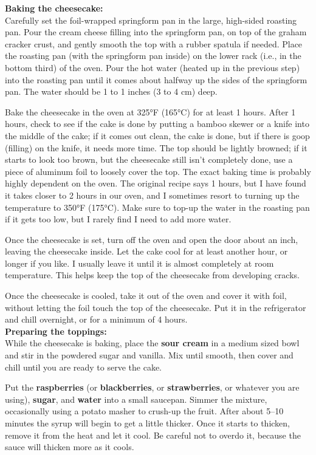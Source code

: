 \noindent \textbf{Baking the cheesecake:} \\ 
Carefully set the foil-wrapped springform pan in the large, high-sided roasting pan. 
Pour the cream cheese filling into the springform pan, on top of the graham cracker crust, and gently smooth the top with a rubber spatula if needed. 
Place the roasting pan (with the springform pan inside) on the lower rack (i.e., in the bottom third) of the oven. 
Pour the hot water (heated up in the previous step) into the roasting pan until it comes about halfway up the sides of the springform pan. 
The water should be 1 to 1 inches (3 to 4 cm) deep. 

Bake the cheesecake in the oven at 325°F (165°C) for at least 1 hours. 
After 1 hours, check to see if the cake is done by putting a bamboo skewer or a knife into the middle of the cake; if it comes out clean, the cake is done, but if there is goop (filling) on the knife, it needs more time. 
The top should be lightly browned; if it starts to look too brown, but the cheesecake still isn’t completely done, use a piece of aluminum foil to loosely cover the top. 
The exact baking time is probably highly dependent on the oven. 
The original recipe says 1 hours, but I have found it takes closer to 2 hours in our oven, and I sometimes resort to turning up the temperature to 350°F (175°C).
Make sure to top-up the water in the roasting pan if it gets too low, but I rarely find I need to add more water.

Once the cheesecake is set, turn off the oven and open the door about an inch, leaving the cheesecake inside. 
Let the cake cool for at least another hour, or longer if you like. 
I usually leave it until it is almost completely at room temperature. 
This helps keep the top of the cheesecake from developing cracks. 

Once the cheesecake is cooled, take it out of the oven and cover it with foil, without letting the foil touch the top of the cheesecake. 
Put it in the refrigerator and chill overnight, or for a minimum of 4 hours. \\

\noindent \textbf{Preparing the toppings:} \\ 
While the cheesecake is baking, place the \textbf{sour cream} in a medium sized bowl and stir in the powdered sugar and vanilla. 
Mix until smooth, then cover and chill until you are ready to serve the cake.

Put the \textbf{raspberries} (or \textbf{blackberries}, or \textbf{strawberries}, or whatever you are using), \textbf{sugar}, and \textbf{water} into a small saucepan. 
Simmer the mixture, occasionally using a potato masher to crush-up the fruit. 
After about 5–10 minutes the syrup will begin to get a little thicker. 
Once it starts to thicken, remove it from the heat and let it cool. 
Be careful not to overdo it, because the sauce will thicken more as it cools. \\

